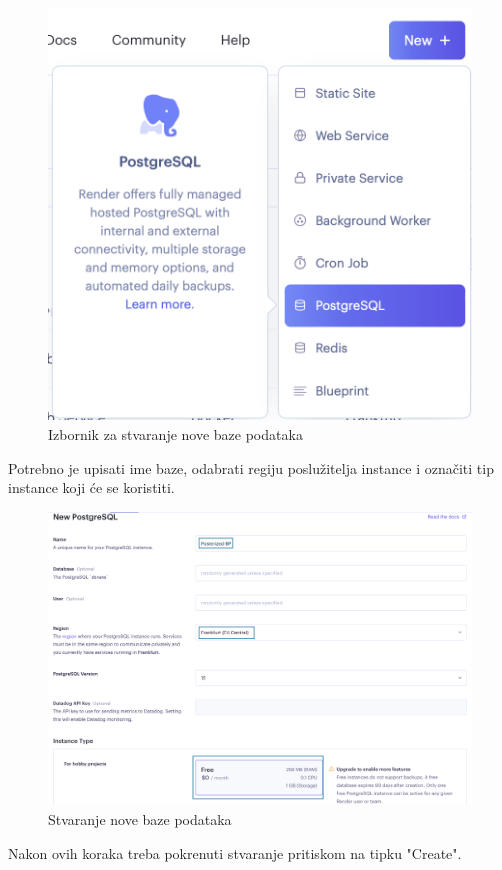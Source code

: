 \begin{enumerate}
			\begin{figure}[H]
				\includegraphics[scale=0.3]{slike/deploy/database1.png} %
				\centering
				\caption{Izbornik za stvaranje nove baze podataka}
				\label{fig:promjene}
			\end{figure}
			
			Potrebno je upisati ime baze, odabrati regiju poslužitelja instance i označiti tip instance koji će se koristiti.
			\begin{figure}[H]
				\includegraphics[scale=0.3]{slike/deploy/database2.png} %
				\centering
				\caption{Stvaranje nove baze podataka}
				\label{fig:promjene}
			\end{figure}
			Nakon ovih koraka treba pokrenuti stvaranje pritiskom na tipku "Create".
			

\end{enumerate}
